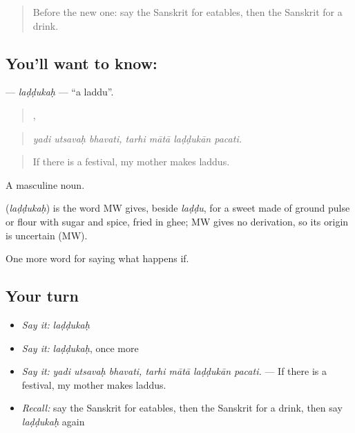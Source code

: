 \label{lesson:SA-C530-laddukah}



\begin{quote}
Before the new one: say the Sanskrit for eatables, then the Sanskrit for a drink.
\end{quote}

\subsection*{You'll want to know: }
\textbf{} — \emph{laḍḍukaḥ} — \textquotedblleft{}a laddu\textquotedblright{}.

\begin{quote}
  ,    
\end{quote}

\begin{quote}
\emph{yadi utsavaḥ bhavati, tarhi mātā laḍḍukān pacati.}
\end{quote}

\begin{quote}
If there is a festival, my mother makes laddus.
\end{quote}

A masculine noun.

\begin{cousinweb}
\textbf{} (\emph{laḍḍukaḥ}) is the word MW gives, beside \emph{laḍḍu}, for a sweet made of ground pulse or flour with sugar and spice, fried in ghee; MW gives no derivation, so its origin is uncertain (MW).
\end{cousinweb}

\begin{grammarlens}[title={What you've built}]
One more word for saying what happens if.
\end{grammarlens}

\subsection*{Your turn}
\begin{itemize}
\raggedright
  \item \emph{Say it:} \emph{laḍḍukaḥ}
  \item \emph{Say it:} \emph{laḍḍukaḥ}, once more
  \item \emph{Say it:} \emph{yadi utsavaḥ bhavati, tarhi mātā laḍḍukān pacati.} — If there is a festival, my mother makes laddus.
  \item \emph{Recall:} say the Sanskrit for eatables, then the Sanskrit for a drink, then say \emph{laḍḍukaḥ} again
\end{itemize}

